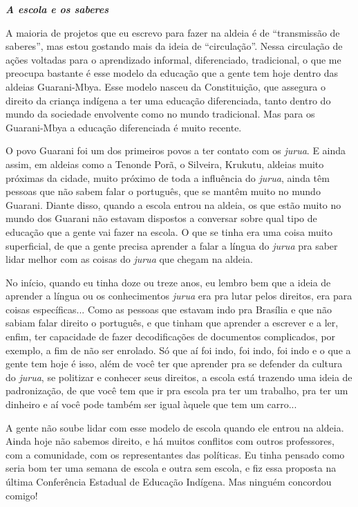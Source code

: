 \emph{\textbf{A escola e os saberes}}

A maioria de projetos que eu escrevo para fazer na aldeia é de
``transmissão de saberes'', mas estou gostando mais da ideia de
``circulação''. Nessa circulação de ações voltadas para o aprendizado
informal, diferenciado, tradicional, o que me preocupa bastante é esse
modelo da educação que a gente tem hoje dentro das aldeias Guarani-Mbya.
Esse modelo nasceu da Constituição, que assegura o direito da criança
indígena a ter uma educação diferenciada, tanto dentro do mundo da
sociedade envolvente como no mundo tradicional. Mas para os Guarani-Mbya
a educação diferenciada é muito recente.

O povo Guarani foi um dos primeiros povos a ter contato com os
\emph{jurua}. E ainda assim, em aldeias como a Tenonde Porã, o Silveira,
Krukutu, aldeias muito próximas da cidade, muito próximo de toda a
influência do \emph{jurua}, ainda têm pessoas que não sabem falar o
português, que se mantêm muito no mundo Guarani. Diante disso, quando a
escola entrou na aldeia, os que estão muito no mundo dos Guarani não
estavam dispostos a conversar sobre qual tipo de educação que a gente
vai fazer na escola. O que se tinha era uma coisa muito superficial, de
que a gente precisa aprender a falar a língua do \emph{jurua} pra saber
lidar melhor com as coisas do \emph{jurua} que chegam na aldeia.

No início, quando eu tinha doze ou treze anos, eu lembro bem que a ideia
de aprender a língua ou os conhecimentos \emph{jurua} era pra lutar
pelos direitos, era para coisas específicas... Como as pessoas que
estavam indo pra Brasília e que não sabiam falar direito o português, e
que tinham que aprender a escrever e a ler, enfim, ter capacidade de
fazer decodificações de documentos complicados, por exemplo, a fim de
não ser enrolado. Só que aí foi indo, foi indo, foi indo e o que a gente
tem hoje é isso, além de você ter que aprender pra se defender da
cultura do \emph{jurua}, se politizar e conhecer seus direitos, a escola
está trazendo uma ideia de padronização, de que você tem que ir pra
escola pra ter um trabalho, pra ter um dinheiro e aí você pode também
ser igual àquele que tem um carro...

A gente não soube lidar com esse modelo de escola quando ele entrou na
aldeia. Ainda hoje não sabemos direito, e há muitos conflitos com outros
professores, com a comunidade, com os representantes das políticas. Eu
tinha pensado como seria bom ter uma semana de escola e outra sem
escola, e fiz essa proposta na última Conferência Estadual de Educação
Indígena. Mas ninguém concordou comigo!

